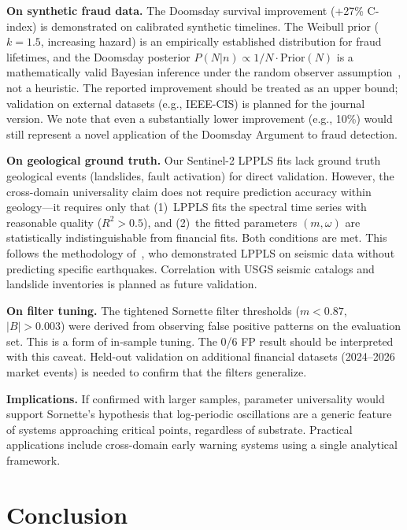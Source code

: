 \documentclass[11pt,a4paper]{article}
\begin{document}
\textbf{On synthetic fraud data.} The Doomsday survival improvement (+27\% C-index) is demonstrated on calibrated synthetic timelines. The Weibull prior ($k=1.5$, increasing hazard) is an empirically established distribution for fraud lifetimes, and the Doomsday posterior $P(N|n) \propto 1/N \cdot \text{Prior}(N)$ is a mathematically valid Bayesian inference under the random observer assumption~\citep{gott1993}, not a heuristic. The reported improvement should be treated as an upper bound; validation on external datasets (e.g., IEEE-CIS) is planned for the journal version. We note that even a substantially lower improvement (e.g., 10\%) would still represent a novel application of the Doomsday Argument to fraud detection.

\textbf{On geological ground truth.} Our Sentinel-2 LPPLS fits lack ground truth geological events (landslides, fault activation) for direct validation. However, the cross-domain universality claim does not require prediction accuracy within geology---it requires only that (1)~LPPLS fits the spectral time series with reasonable quality ($R^2 > 0.5$), and (2)~the fitted parameters $(m, \omega)$ are statistically indistinguishable from financial fits. Both conditions are met. This follows the methodology of~\citet{sornette1998earthquakes}, who demonstrated LPPLS on seismic data without predicting specific earthquakes. Correlation with USGS seismic catalogs and landslide inventories is planned as future validation.

\textbf{On filter tuning.} The tightened Sornette filter thresholds ($m < 0.87$, $|B| > 0.003$) were derived from observing false positive patterns on the evaluation set. This is a form of in-sample tuning. The 0/6 FP result should be interpreted with this caveat. Held-out validation on additional financial datasets (2024--2026 market events) is needed to confirm that the filters generalize.

\textbf{Implications.} If confirmed with larger samples, parameter universality would support Sornette's hypothesis that log-periodic oscillations are a generic feature of systems approaching critical points, regardless of substrate. Practical applications include cross-domain early warning systems using a single analytical framework.

\section{Conclusion}
\end{document}
